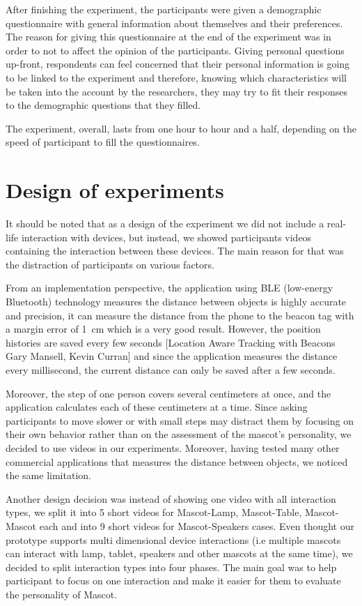 \par After finishing the experiment, the participants were given a demographic questionnaire with general information about themselves and their preferences. The reason for giving this questionnaire at the end of the experiment was in order to not to affect the opinion of the participants. Giving personal questions up-front, respondents can feel concerned that their personal information is going to be linked to the experiment and therefore, knowing which characteristics will be taken into the account by the researchers, they may try to fit their responses to the demographic questions that they filled.
\par The experiment, overall, lasts from one hour to hour and a half, depending on the speed of participant to fill the questionnaires.

\section{Design of experiments}
\par It should be noted that as a design of the experiment we did not include a real-life interaction with devices, but instead, we showed participants videos containing the interaction between these devices. The main reason for that was the distraction of participants on various factors. 
\par From an implementation perspective, the application using BLE (low-energy Bluetooth) technology measures the distance between objects is highly accurate and precision, it can measure the distance from the phone to the beacon tag with a margin error of 1 cm which is a very good result. However, the position histories are saved every few seconds [Location Aware Tracking with Beacons Gary Mansell, Kevin Curran] and since the application measures the distance every millisecond, the current distance can only be saved after a few seconds. 
\par Moreover, the step of one person covers several centimeters at once, and the application calculates each of these centimeters at a time. Since asking participants to move slower or with small steps may distract them by focusing on their own behavior rather than on the assessment of the mascot's personality, we decided to use videos in our experiments. Moreover, having tested many other commercial applications that measures the distance between objects, we noticed the same limitation.
\par Another design decision was instead of showing one video with all interaction types, we split it into 5 short videos for Mascot-Lamp, Mascot-Table, Mascot-Mascot each and into 9 short videos for Mascot-Speakers cases. Even thought our prototype supports multi dimensional device interactions (i.e multiple mascots can interact with lamp, tablet, speakers and other mascots at the same time), we decided to split interaction types into four phases. The main goal was to help participant to focus on one interaction and make it easier for them to evaluate the personality of Mascot.

